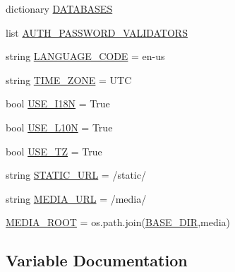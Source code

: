 \begin{DoxyCompactItemize}
\item 
dictionary \mbox{\hyperlink{namespace_cell_segmentation_1_1settings_a5cf93172a3dcca2b5cdc7f31d29eb28c}{D\+A\+T\+A\+B\+A\+S\+ES}}
\item 
list \mbox{\hyperlink{namespace_cell_segmentation_1_1settings_afdd5aa49192f7f532c0854062f6e2d16}{A\+U\+T\+H\+\_\+\+P\+A\+S\+S\+W\+O\+R\+D\+\_\+\+V\+A\+L\+I\+D\+A\+T\+O\+RS}}
\item 
string \mbox{\hyperlink{namespace_cell_segmentation_1_1settings_ac73bad9ef24ef696f2df260657a0e61c}{L\+A\+N\+G\+U\+A\+G\+E\+\_\+\+C\+O\+DE}} = \textquotesingle{}en-\/us\textquotesingle{}
\item 
string \mbox{\hyperlink{namespace_cell_segmentation_1_1settings_a1f48388d09c7f8ef633a3be8ebbc43b1}{T\+I\+M\+E\+\_\+\+Z\+O\+NE}} = \textquotesingle{}U\+TC\textquotesingle{}
\item 
bool \mbox{\hyperlink{namespace_cell_segmentation_1_1settings_af72e8510bb688294b7bd306fd168c7da}{U\+S\+E\+\_\+\+I18N}} = True
\item 
bool \mbox{\hyperlink{namespace_cell_segmentation_1_1settings_ad46d741a51b2fffd4515476c97e10bae}{U\+S\+E\+\_\+\+L10N}} = True
\item 
bool \mbox{\hyperlink{namespace_cell_segmentation_1_1settings_ac432bed0e57059113c8e1a81a5bba83a}{U\+S\+E\+\_\+\+TZ}} = True
\item 
string \mbox{\hyperlink{namespace_cell_segmentation_1_1settings_af1a1f425efd86c1b7e1148b59c82ba40}{S\+T\+A\+T\+I\+C\+\_\+\+U\+RL}} = \textquotesingle{}/static/\textquotesingle{}
\item 
string \mbox{\hyperlink{namespace_cell_segmentation_1_1settings_afcfd924da96d24487cefb726d70ba95f}{M\+E\+D\+I\+A\+\_\+\+U\+RL}} = \textquotesingle{}/media/\textquotesingle{}
\item 
\mbox{\hyperlink{namespace_cell_segmentation_1_1settings_a533430f4561df8251c4e9f96b6cf3d56}{M\+E\+D\+I\+A\+\_\+\+R\+O\+OT}} = os.\+path.\+join(\mbox{\hyperlink{namespace_cell_segmentation_1_1settings_a354c3e9bde5b55650a0e821028acf8c2}{B\+A\+S\+E\+\_\+\+D\+IR}},\textquotesingle{}media\textquotesingle{})
\end{DoxyCompactItemize}


\subsection{Variable Documentation}
\mbox{\label{namespace_cell_segmentation_1_1settings_aa1860414aa297264b68c5d9de3c0bb3e}} 
